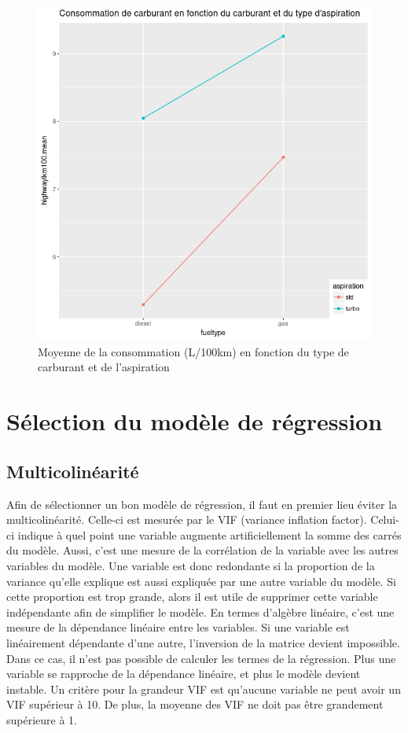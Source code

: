 \documentclass[11pt,a4paper]{article}
\begin{document}
\begin{figure}
	\centering
	\includegraphics[width=0.8\linewidth]{meanauto}
	\caption{Moyenne de la consommation (L/100km) en fonction du type de carburant et de l'aspiration}
	\label{fig:meanauto}
\end{figure}

\section{Sélection du modèle de régression}

\subsection{Multicolinéarité}

Afin de sélectionner un bon modèle de régression, il faut en premier lieu éviter la multicolinéarité. Celle-ci est mesurée par le VIF (variance inflation factor). Celui-ci indique à quel point une variable augmente artificiellement la somme des carrés du modèle. Aussi, c'est une mesure de la corrélation de la variable avec les autres variables du modèle. Une variable est donc redondante si la proportion de la variance qu'elle explique est aussi expliquée par une autre variable du modèle. Si cette proportion est trop grande, alors il est utile de supprimer cette variable indépendante afin de simplifier le modèle. En termes d'algèbre linéaire, c'est une mesure de la dépendance linéaire entre les variables. Si une variable est linéairement dépendante d'une autre, l'inversion de la matrice devient impossible. Dans ce cas, il n'est pas possible de calculer les termes de la régression. Plus une variable se rapproche de la dépendance linéaire, et plus le modèle devient instable.
Un critère pour la grandeur VIF est qu'aucune variable ne peut avoir un VIF supérieur à 10. De plus, la moyenne des VIF ne doit pas être  grandement supérieure à 1.
\end{document}

